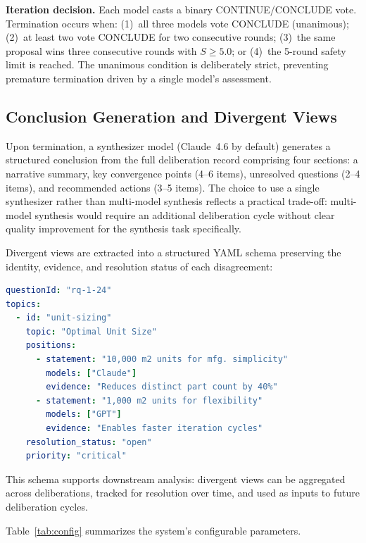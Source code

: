 \documentclass[11pt,a4paper]{article}
\begin{document}
\textbf{Iteration decision.} Each model casts a binary CONTINUE/CONCLUDE vote. Termination occurs when: (1)~all three models vote CONCLUDE (unanimous); (2)~at least two vote CONCLUDE for two consecutive rounds; (3)~the same proposal wins three consecutive rounds with $S \geq 5.0$; or (4)~the 5-round safety limit is reached. The unanimous condition is deliberately strict, preventing premature termination driven by a single model's assessment.

\subsection{Conclusion Generation and Divergent Views}
\label{sec:conclusion_divergent}

Upon termination, a synthesizer model (Claude~4.6 by default) generates a structured conclusion from the full deliberation record comprising four sections: a narrative summary, key convergence points (4--6 items), unresolved questions (2--4 items), and recommended actions (3--5 items). The choice to use a single synthesizer rather than multi-model synthesis reflects a practical trade-off: multi-model synthesis would require an additional deliberation cycle without clear quality improvement for the synthesis task specifically.

Divergent views are extracted into a structured YAML schema preserving the identity, evidence, and resolution status of each disagreement:

\begin{lstlisting}[language=yaml,caption={Divergent views schema with model attribution.}]
questionId: "rq-1-24"
topics:
  - id: "unit-sizing"
    topic: "Optimal Unit Size"
    positions:
      - statement: "10,000 m2 units for mfg. simplicity"
        models: ["Claude"]
        evidence: "Reduces distinct part count by 40%"
      - statement: "1,000 m2 units for flexibility"
        models: ["GPT"]
        evidence: "Enables faster iteration cycles"
    resolution_status: "open"
    priority: "critical"
\end{lstlisting}

This schema supports downstream analysis: divergent views can be aggregated across deliberations, tracked for resolution over time, and used as inputs to future deliberation cycles.

Table~\ref{tab:config} summarizes the system's configurable parameters.
\end{document}
